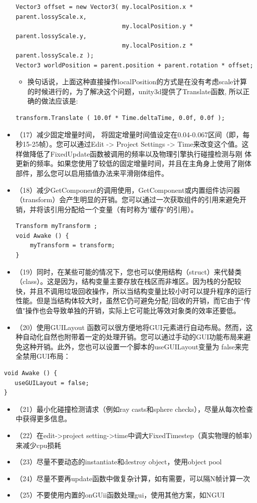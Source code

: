 \documentclass[9pt, b5paper]{article}
\begin{document}
\begin{itemize}
\begin{verbatim}
Vector3 offset = new Vector3( my.localPosition.x * parent.lossyScale.x, 
                              my.localPosition.y * parent.lossyScale.y, 
                              my.localPosition.z * parent.lossyScale.z );
Vector3 worldPosition = parent.position + parent.rotation * offset;
\end{verbatim}
\begin{itemize}
\item 换句话说，上面这种直接操作localPosition的方式是在没有考虑scale计算的时候进行的，为了解决这个问题，unity3d提供了Translate函数, 所以正确的做法应该是:
\end{itemize}
\begin{verbatim}
transform.Translate ( 10.0f * Time.deltaTime, 0.0f, 0.0f );
\end{verbatim}
\item （17）减少固定增量时间， 将固定增量时间值设定在0.04-0.067区间（即，每秒15-25帧）。您可以通过Edit -> Project Settings -> Time来改变这个值。这样做降低了FixedUpdate函数被调用的频率以及物理引擎执行碰撞检测与刚 体更新的频率。如果您使用了较低的固定增量时间，并且在主角身上使用了刚体部件，那么您可以启用插值办法来平滑刚体组件。
\item （18）减少GetComponent的调用使用，GetComponent或内置组件访问器（transform）会产生明显的开销。您可以通过一次获取组件的引用来避免开销，并将该引用分配给一个变量（有时称为"缓存"的引用）。
\begin{verbatim}
Transform myTransform ;
void Awake () {
    myTransform = transform;
}
\end{verbatim}
\item （19）同时，在某些可能的情况下，您也可以使用结构（struct）来代替类（class）。这是因为，结构变量主要存放在栈区而非堆区。因为栈的分配较快，并且不调用垃圾回收操作，所以当结构变量比较小时可以提升程序的运行性能。但是当结构体较大时，虽然它仍可避免分配/回收的开销，而它由于"传值"操作也会导致单独的开销，实际上它可能比等效对象类的效率还要低。
\item （20）使用GUILayout 函数可以很方便地将GUI元素进行自动布局。然而，这种自动化自然也附带着一定的处理开销。您可以通过手动的GUI功能布局来避免这种开销。此外，您也可以设置一个脚本的useGUILayout变量为 false来完全禁用GUI布局：
\end{itemize}
\begin{verbatim}
void Awake () {
   useGUILayout = false;
}
\end{verbatim}
\begin{itemize}
\item （21）最小化碰撞检测请求（例如ray casts和sphere checks），尽量从每次检查中获得更多信息。
\item （22）在edit->project setting->time中调大FixedTimestep（真实物理的帧率）来减少cpu损耗
\item （23）尽量不要动态的instantiate和destroy object，使用object pool
\item （24）尽量不要再update函数中做复杂计算，如有需要，可以隔N帧计算一次
\item （25）不要使用内置的onGUii函数处理gui，使用其他方案，如NGUI
\end{itemize}
\end{document}
